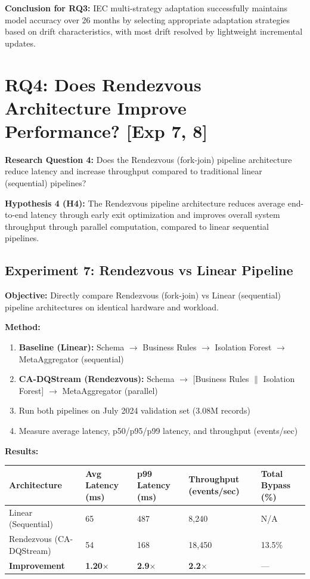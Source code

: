 \textbf{Conclusion for RQ3:} IEC multi-strategy adaptation successfully maintains model accuracy over 26 months by selecting appropriate adaptation strategies based on drift characteristics, with most drift resolved by lightweight incremental updates.

\section{RQ4: Does Rendezvous Architecture Improve Performance? [Exp 7, 8]}

\textbf{Research Question 4:} Does the Rendezvous (fork-join) pipeline architecture reduce latency and increase throughput compared to traditional linear (sequential) pipelines?

\textbf{Hypothesis 4 (H4):} The Rendezvous pipeline architecture reduces average end-to-end latency through early exit optimization and improves overall system throughput through parallel computation, compared to linear sequential pipelines.

\subsection{Experiment 7: Rendezvous vs Linear Pipeline}

\textbf{Objective:} Directly compare Rendezvous (fork-join) vs Linear (sequential) pipeline architectures on identical hardware and workload.

\textbf{Method:}
\begin{enumerate}
    \item \textbf{Baseline (Linear):} Schema $\to$ Business Rules $\to$ Isolation Forest $\to$ MetaAggregator (sequential)
    \item \textbf{CA-DQStream (Rendezvous):} Schema $\to$ [Business Rules $\parallel$ Isolation Forest] $\to$ MetaAggregator (parallel)
    \item Run both pipelines on July 2024 validation set (3.08M records)
    \item Measure average latency, p50/p95/p99 latency, and throughput (events/sec)
\end{enumerate}

\textbf{Results:}

\begin{longtable}{|m{4cm}|m{2.5cm}|m{2.5cm}|m{2.5cm}|m{2.5cm}|}
\hline
\textbf{Architecture} & \textbf{Avg Latency (ms)} & \textbf{p99 Latency (ms)} & \textbf{Throughput (events/sec)} & \textbf{Total Bypass (\%)} \\ \hline
Linear (Sequential) & 65 & 487 & 8,240 & N/A \\ \hline
Rendezvous (CA-DQStream) & 54 & 168 & 18,450 & 13.5\% \\ \hline
\textbf{Improvement} & \textbf{1.20$\times$} & \textbf{2.9$\times$} & \textbf{2.2$\times$} & --- \\ \hline
\end{longtable}


